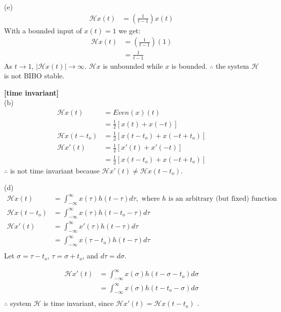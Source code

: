 \documentclass{article}
\begin{document}
(e)
\begin{equation*}
\begin{split}
    \mathcal{H}x(t) &= (\frac{1}{t - 1})x(t)
\end{split}
\end{equation*}
With a bounded input of $x(t) = 1$ we get:
\begin{equation*}
\begin{split}
    \mathcal{H}x(t) &= (\frac{1}{t - 1})(1)\\
    &= \frac{1}{t - 1}
\end{split}
\end{equation*}
As $t \rightarrow 1$, $|\mathcal{H}x(t)| \rightarrow \infty$. $\mathcal{H}x$ is unbounded while $x$ is bounded. $\therefore$ the system $\mathcal{H}$ is not BIBO stable.


 {\bf [time invariant]}\\
(b)
\begin{equation*}
\begin{split}
    \mathcal{H}x(t) &= Even(x)(t)\\
    &= \frac{1}{2}[x(t) + x(-t)]\\
    \mathcal{H}x(t - t_o) &= \frac{1}{2}[x(t - t_o) + x(-t + t_o)]\\
    \mathcal{H}x'(t) &= \frac{1}{2}[x'(t) + x'(-t)]\\
    &=\frac{1}{2}[x(t - t_o) + x(-t + t_o)]
\end{split}
\end{equation*}
$\therefore$ is not time invariant because $\mathcal{H}x'(t) \neq \mathcal{H}x(t - t_o)$.

(d)
\begin{equation*}
\begin{split}
    \mathcal{H}x(t) &= \int_{-\infty}^{\infty} x (\tau) h (t - \tau) d\tau, \text{ where $h$ is an arbitrary (but fixed) function}\\
    \mathcal{H}x(t - t_o) &= \int_{-\infty}^{\infty} x(\tau) h (t - t_o - \tau)d\tau\\
    \mathcal{H}x'(t) &= \int_{-\infty}^{\infty} x'(\tau) h (t - \tau) d\tau\\
    &= \int_{-\infty}^{\infty} x(\tau - t_o) h (t - \tau) d\tau\\
\end{split}
\end{equation*}
Let $\sigma = \tau - t_o$, $\tau = \sigma + t_o$, and $d\tau = d\sigma$.

\begin{equation*}
\begin{split}
    \mathcal{H}x'(t) &= \int_{-\infty}^{\infty} x(\sigma) h (t - \sigma - t_o) d \sigma\\
    &= \int_{-\infty}^{\infty} x(\sigma) h (t - t_o - \sigma) d \sigma\\
\end{split}
\end{equation*}
$\therefore$ system $\mathcal{H}$ is time invariant, since $\mathcal{H}x'(t) = \mathcal{H}x(t - t_o)$ .
\end{document}
